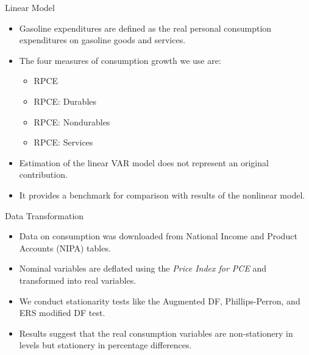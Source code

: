 \documentclass[
  10pt,
  ignorenonframetext,
]{beamer}
\providecommand{\tightlist}{%
  \setlength{\itemsep}{0pt}\setlength{\parskip}{0pt}}
\begin{document}
\begin{frame}{Linear Model}
\protect\hypertarget{linear-model-1}{}

\begin{itemize}
\item
  Gasoline expenditures are defined as the real personal consumption
  expenditures on gasoline goods and services.
\item
  The four measures of consumption growth we use are:

  \begin{itemize}
  \tightlist
  \item
    RPCE
  \item
    RPCE: Durables
  \item
    RPCE: Nondurables
  \item
    RPCE: Services
  \end{itemize}
\item
  Estimation of the linear VAR model does not represent an original
  contribution.
\item
  It provides a benchmark for comparison with results of the nonlinear
  model.
\end{itemize}

\end{frame}

\begin{frame}{Data Transformation}
\protect\hypertarget{data-transformation}{}

\begin{itemize}
\item
  Data on consumption was downloaded from National Income and Product
  Accounts (NIPA) tables.
\item
  Nominal variables are deflated using the \emph{Price Index for PCE}
  and transformed into real variables.
\item
  We conduct stationarity tests like the Augmented DF, Phillips-Perron,
  and ERS modified DF test.
\item
  Results suggest that the real consumption variables are non-stationery
  in levels but stationery in percentage differences.
\end{itemize}

\end{frame}
\end{document}
